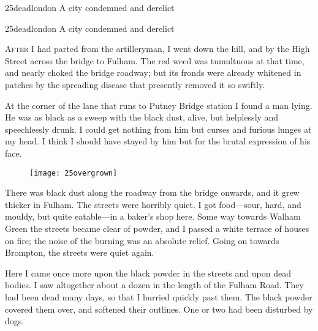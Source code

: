 



\begin{letter}
	\begin{bwbigpic}
		[1.2] 
		{25deadlondon} 
		{A city condemned and derelict} 
	\end{bwbigpic}
\end{letter}

\begin{a4}
	\begin{bwbigpic}
		[1.1] 
		{25deadlondon} 
		{A city condemned and derelict} 
	\end{bwbigpic}
\end{a4}

\lettrine[lines=4,findent=2pt]{A}{fter} I had parted from the artilleryman, I went down the hill, and by the High Street across the bridge to Fulham. The red weed was tumultuous at that time, and nearly choked the bridge roadway; but its fronds were already whitened in patches by the spreading disease that presently removed it so swiftly.

At the corner of the lane that runs to Putney Bridge station I found a man lying. He was as black as a sweep with the black dust, alive, but helplessly and speechlessly drunk. I could get nothing from him but curses and furious lunges at my head. I think I should have stayed by him but for the brutal expression of his face.

\begin{figure}[tb!]
\centering
\texttt{[image: 25overgrown]}
\end{figure}

There was black dust along the roadway from the bridge onwards, and it grew thicker in Fulham. The streets were horribly quiet. I got food—sour, hard, and mouldy, but quite eatable—in a baker's shop here. Some way towards Walham Green the streets became clear of powder, and I passed a white terrace of houses on fire; the noise of the burning was an absolute relief. Going on towards Brompton, the streets were quiet again.

Here I came once more upon the black powder in the streets and upon dead bodies. I saw altogether about a dozen in the length of the Fulham Road. They had been dead many days, so that I hurried quickly past them. The black powder covered them over, and softened their outlines. One or two had been disturbed by dogs.



